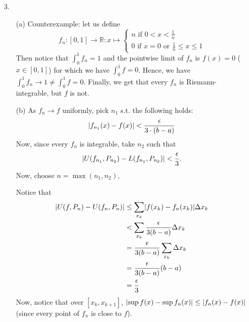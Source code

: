 \documentclass[11pt]{article}
\DeclarePairedDelimiter\abs{\lvert}{\rvert}%
\newcommand{\reals}{\mathbb{R}}
\begin{document}
\begin{itemize}
    \item[3.]
        \begin{itemize}
            \item[(a)]
                Counterexample: let us define
                \begin{equation*}
                    f_n : [0, 1] \to \reals : x \mapsto
                    \begin{cases}
                        n \text{ if } 0 < x < \frac{1}{n}\\
                        0 \text{ if $x = 0$ or $\frac{1}{n} \leq x \leq 1$}
                    \end{cases}
                \end{equation*}
                Then notice that $\int_0^1 f_n = 1$ and the pointwise limit of
                $f_n$ is $f(x) = 0$ ($x \in [0, 1]$) for which we have
                $\int_0^1 f = 0$. Hence, we have $\int_0^1 f_n \to 1 \neq
                \int_0^1 f = 0$. Finally, we get that every $f_n$ is
                Riemann-integrable, but $f$ is not.

            \item[(b)]
                As $f_n \to f$ uniformly, pick $n_1$ s.t. the following holds:
                \begin{equation*}
                  \abs{f_{n_1}(x) - f(x)} < \frac{\epsilon}{3\cdot(b-a)}
                \end{equation*}
                Now, since every $f_n$ is integrable, take $n_2$ such that
                \begin{equation*}
                  \abs{U(f_{n_1}, P_{n_2}) - L(f_{n_1}, P_{n_2})} <
                        \frac{\epsilon}{3}.
                \end{equation*}
                Now, choose $n = \max(n_1, n_2)$,

                Notice that 
                \begin{align*}
                    \abs{
                        U(f, P_{n}) - U(f_n, P_{n})
                    } 
                    &\leq \sum_{x_k} \abs{f(x_k) - f_n(x_k)} \Delta x_k\\
                    &< \sum_{x_k} \frac{\epsilon}{3(b-a)} \Delta x_k\\
                    &= \frac{\epsilon}{3(b-a)} \sum_{x_k} \Delta x_k\\
                    &= \frac{\epsilon}{3(b-a)} (b-a)\\
                    &= \frac{\epsilon}{3}
                \end{align*}
                Now, notice that over $[x_k, x_{k+1}]$, $\abs{\sup f(x) - \sup
                f_n(x)} \leq \abs{f_{n}(x) - f(x)}$ (since every point of $f_n$
                is close to $f$).


\end{itemize}
\end{itemize}
\end{document}
